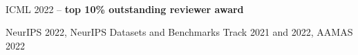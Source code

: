 \documentclass[]{lukas-cv-openfont}
\begin{document}
\noindent
{}
\\
\tinysectionsep




\noindent
\begin{tightitemize}{1.0em}
    \item ICML 2022 -- \textbf{top 10\% outstanding reviewer award}
    \item NeurIPS 2022, NeurIPS Datasets and Benchmarks Track 2021 and 2022, AAMAS 2022
\end{tightitemize}
\sectionsep



\end{document}
